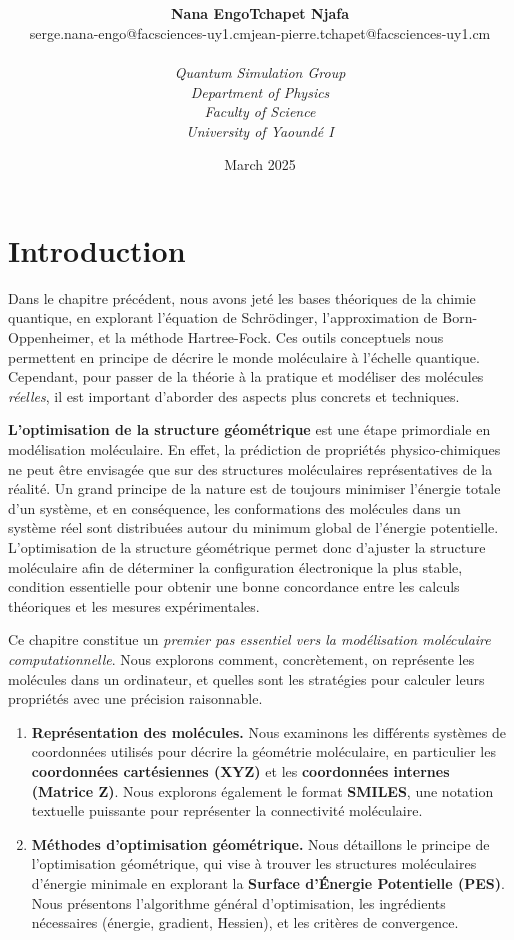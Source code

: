 \documentclass[12pt,a4paper]{article} %
\title{\vspace*{4cm}
\Huge\tcb{Chapter 2 - Aspects généraux de la représentation moléculaire}
\vspace*{5cm}}
\author{
\begin{tabular}{lr}
 \textbf{Nana Engo} & \textbf{Tchapet Njafa}\\
 {\small serge.nana-engo@facsciences-uy1.cm} &\hspace*{2em}
 {\small jean-pierre.tchapet@facsciences-uy1.cm}
\end{tabular}\\[3em] %
\textit{Quantum Simulation Group}\\
 \textit{Department of Physics} \\ 
 \textit{Faculty of Science} \\ 
 \textit{University of Yaoundé I}
}
\date{\vspace*{3cm}March 2025} %
\numberwithin{equation}{section} %
\numberwithin{figure}{section} %
\numberwithin{table}{section} %
\begin{document}
\maketitle %

\newpage
\section{Introduction}

Dans le chapitre précédent, nous avons jeté les bases théoriques de la chimie quantique, en explorant l'équation de Schrödinger, l'approximation de Born-Oppenheimer, et la méthode Hartree-Fock. Ces outils conceptuels nous permettent en principe de décrire le monde moléculaire à l'échelle quantique. Cependant, pour passer de la théorie à la pratique et modéliser des molécules \textit{réelles}, il est important d'aborder des aspects plus concrets et techniques.

\textbf{L'optimisation de la structure géométrique} est une étape primordiale en modélisation moléculaire. En effet, la prédiction de propriétés physico-chimiques ne peut être envisagée que sur des structures moléculaires représentatives de la réalité. Un grand principe de la nature est de toujours minimiser l'énergie totale d'un système, et en conséquence, les conformations des molécules dans un système réel sont distribuées autour du minimum global de l'énergie potentielle. L'optimisation de la structure géométrique permet donc d'ajuster la structure moléculaire afin de déterminer la configuration électronique la plus stable, condition essentielle pour obtenir une bonne concordance entre les calculs théoriques et les mesures expérimentales.

Ce chapitre constitue un \textit{premier pas essentiel vers la modélisation moléculaire computationnelle}. Nous explorons comment, concrètement, on représente les molécules dans un ordinateur, et quelles sont les stratégies pour calculer leurs propriétés avec une précision raisonnable.

\begin{enumerate}
 \item \textbf{Représentation des molécules.} Nous examinons les différents systèmes de coordonnées utilisés pour décrire la géométrie moléculaire, en particulier les \textbf{coordonnées cartésiennes (XYZ)} et les \textbf{coordonnées internes (Matrice Z)}. Nous explorons également le format \textbf{SMILES}, une notation textuelle puissante pour représenter la connectivité moléculaire.
 
 \item \textbf{Méthodes d'optimisation géométrique.} Nous détaillons le principe de l'optimisation géométrique, qui vise à trouver les structures moléculaires d'énergie minimale en explorant la \textbf{Surface d'Énergie Potentielle (PES)}. Nous présentons l'algorithme général d'optimisation, les ingrédients nécessaires (énergie, gradient, Hessien), et les critères de convergence.
\end{enumerate}
\end{document}
